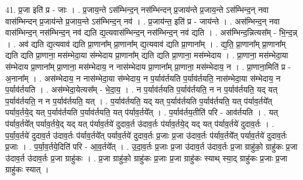 \documentclass[17pt]{extarticle}
\begin{document}
41. प्र॒जा इति॑ प्र - जाः । . प्र॒जाय॒न्ते ऽस॑म्भिन्द॒न् नस॑म्भिन्दन् प्र॒जाय॑न्ते प्र॒जाय॒न्ते ऽस॑म्भिन्द॒न् नवा वास॑म्भिन्दन् प्र॒जाय॑न्ते प्र॒जाय॒न्ते ऽस॑म्भिन्द॒न् नव॑ । . प्र॒जाय॑न्त॒ इति॑ प्र - जाय॑न्ते । . अस॑म्भिन्द॒न् नवा वास॑म्भिन्द॒न् नस॑म्भिन्द॒न् नव॑ द्यति द्य॒त्यवास॑म्भिन्द॒न् नस॑म्भिन्द॒न् नव॑ द्यति । . अस॑म्भिन्द॒न्नित्यस᳚म् - भि॒न्द॒न्न् । . अव॑ द्यति द्य॒त्यवाव॑ द्यति प्रा॒णाना᳚म् प्रा॒णाना᳚म् द्य॒त्यवाव॑ द्यति प्रा॒णाना᳚म् । . द्य॒ति॒ प्रा॒णाना᳚म् प्रा॒णाना᳚म् द्यति द्यति प्रा॒णाना॒ मस॑म्भेदा॒या स॑म्भेदाय प्रा॒णाना᳚म् द्यति द्यति प्रा॒णाना॒ मस॑म्भेदाय । . प्रा॒णाना॒ मस॑म्भेदा॒या स॑म्भेदाय प्रा॒णाना᳚म् प्रा॒णाना॒ मस॑म्भेदाय॒ न नास॑म्भेदाय प्रा॒णाना᳚म् प्रा॒णाना॒ मस॑म्भेदाय॒ न । . प्रा॒णाना॒मिति॑ प्र - अ॒नाना᳚म् । . अस॑म्भेदाय॒ न नास॑म्भेदा॒या स॑म्भेदाय॒ न प॒र्याव॑र्तयति प॒र्याव॑र्तयति॒ नास॑म्भेदा॒या स॑म्भेदाय॒ न प॒र्याव॑र्तयति । . अस॑म्भेदा॒येत्यस᳚म् - भे॒दा॒य॒ । . न प॒र्याव॑र्तयति प॒र्याव॑र्तयति॒ न न प॒र्याव॑र्तयति॒ यद् यत् प॒र्याव॑र्तयति॒ न न प॒र्याव॑र्तयति॒ यत् । . प॒र्याव॑र्तयति॒ यद् यत् प॒र्याव॑र्तयति प॒र्याव॑र्तयति॒ यत् प॑र्याव॒र्तये᳚त् पर्याव॒र्तये॒द् यत् प॒र्याव॑र्तयति प॒र्याव॑र्तयति॒ यत् प॑र्याव॒र्तये᳚त् । . प॒र्याव॑र्तय॒तीति॑ परि - आव॑र्तयति । . यत् प॑र्याव॒र्तये᳚त् पर्याव॒र्तये॒द् यद् यत् प॑र्याव॒र्तये॑ दुदाव॒र्त उ॑दाव॒र्तः प॑र्याव॒र्तये॒द् यद् यत् प॑र्याव॒र्तये॑ दुदाव॒र्तः । . प॒र्या॒व॒र्तये॑ दुदाव॒र्त उ॑दाव॒र्तः प॑र्याव॒र्तये᳚त् पर्याव॒र्तये॑ दुदाव॒र्तः प्र॒जाः प्र॒जा उ॑दाव॒र्तः प॑र्याव॒र्तये᳚त् पर्याव॒र्तये॑ दुदाव॒र्तः प्र॒जाः । . प॒र्या॒व॒र्तये॒दिति॑ परि - आ॒व॒र्तये᳚त् । . उ॒दा॒व॒र्तः प्र॒जाः प्र॒जा उ॑दाव॒र्त उ॑दाव॒र्तः प्र॒जा ग्राहु॑को॒ ग्राहु॑कः प्र॒जा उ॑दाव॒र्त उ॑दाव॒र्तः प्र॒जा ग्राहु॑कः । . प्र॒जा ग्राहु॑को॒ ग्राहु॑कः प्र॒जाः प्र॒जा ग्राहु॑कः स्याथ् स्या॒द् ग्राहु॑कः प्र॒जाः प्र॒जा ग्राहु॑कः स्यात् । \newline
\end{document}
